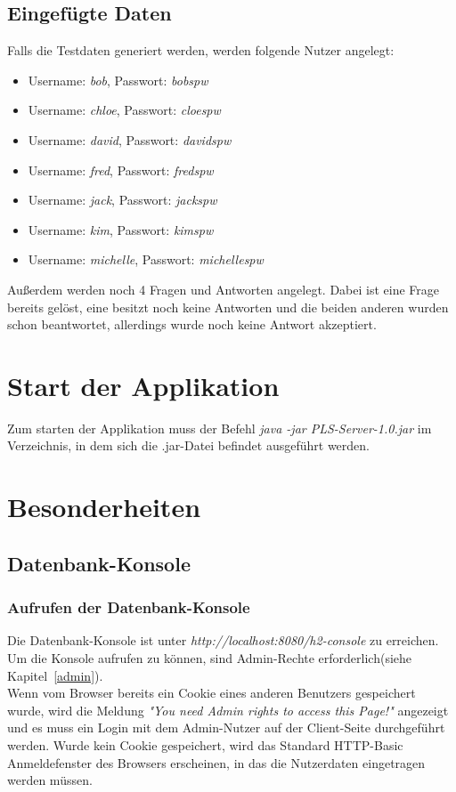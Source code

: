 \documentclass[a4paper]{report}
\begin{document}
\section{Eingefügte Daten}
Falls die Testdaten generiert werden, werden folgende Nutzer angelegt:
\begin{itemize}
	\item Username: \textit{bob}, Passwort: \textit{bobspw}
	\item Username: \textit{chloe}, Passwort: \textit{cloespw}
	\item Username: \textit{david}, Passwort: \textit{davidspw}
	\item Username: \textit{fred}, Passwort: \textit{fredspw}
	\item Username: \textit{jack}, Passwort: \textit{jackspw}
	\item Username: \textit{kim}, Passwort: \textit{kimspw}
	\item Username: \textit{michelle}, Passwort: \textit{michellespw}
\end{itemize}
Außerdem werden noch 4 Fragen und Antworten angelegt. Dabei ist eine Frage bereits gelöst, eine besitzt noch keine Antworten und die beiden anderen wurden schon beantwortet, allerdings wurde noch keine Antwort akzeptiert.
\chapter{Start der Applikation}
Zum starten der Applikation muss der Befehl \textit{java -jar PLS-Server-1.0.jar} im Verzeichnis, in dem sich die .jar-Datei befindet ausgeführt werden.
\chapter{Besonderheiten}
\section{Datenbank-Konsole}
\subsection{Aufrufen der Datenbank-Konsole}
Die Datenbank-Konsole ist unter \textit{http://localhost:8080/h2-console} zu erreichen. Um die Konsole aufrufen zu können, sind Admin-Rechte erforderlich(siehe Kapitel~\ref{admin}).\\ 
Wenn vom Browser bereits ein Cookie eines anderen Benutzers gespeichert wurde, wird die Meldung \textit{"You need Admin rights to access this Page!"} angezeigt und es muss ein Login mit dem Admin-Nutzer auf der Client-Seite durchgeführt werden. Wurde kein Cookie gespeichert, wird das Standard HTTP-Basic Anmeldefenster des Browsers erscheinen, in das die Nutzerdaten eingetragen werden müssen.
\end{document}
